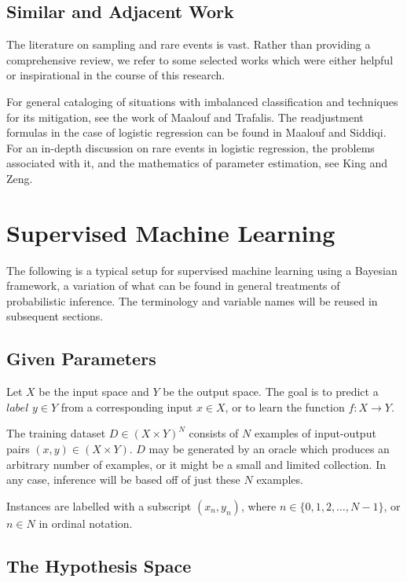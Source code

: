 \documentclass[twoside]{article}
\begin{document}
\subsection{Similar and Adjacent Work}

The literature on sampling and rare events is vast. Rather than providing a comprehensive review, we refer to some selected works which were either helpful or inspirational in the course of this research.

For general cataloging of situations with imbalanced classification and techniques for its mitigation, see the work of Maalouf and Trafalis\cite{rareevents}. The readjustment formulas in the case of logistic regression can be found in Maalouf and Siddiqi\cite{weightedlogistic}. For an in-depth discussion on rare events in logistic regression, the problems associated with it, and the mathematics of parameter estimation, see King and Zeng\cite{king}.

\section{Supervised Machine Learning} \label{framework}

The following is a typical setup for supervised machine learning using a Bayesian framework, a variation of what can be found in general treatments of probabilistic inference\cite{blais}\cite{gelmanbayes}\cite{pythonbayes}. The terminology and variable names will be reused in subsequent sections.

\subsection{Given Parameters}

Let \(X\) be the input space and \(Y\) be the output space. The goal is to predict a \(label\) \(y \in Y\) from a corresponding input \(x \in X\), or to learn the function \(f: X \to Y\).

The training dataset \(D \in (X \times Y)^N\) consists of \(N\) examples of input-output pairs \((x, y) \in (X \times Y) \). \(D\) may be generated by an oracle which produces an arbitrary number of examples, or it might be a small and limited collection. In any case, inference will be based off of just these \(N\) examples.

Instances are labelled with a subscript \((x_n, y_n)\), where \(n \in \{0, 1, 2,\ldots,N-1\}\), or \(n \in N\) in ordinal notation.

\subsection{The Hypothesis Space}
\end{document}
